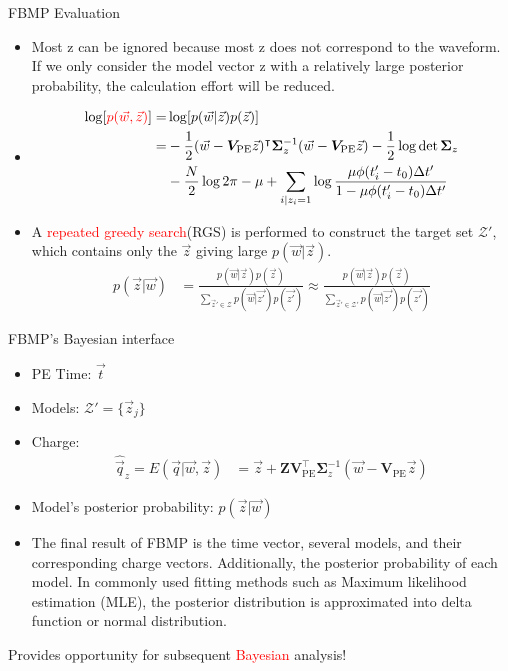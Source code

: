 \documentclass[final]{beamer}
\newlength{\colwidth}
\begin{document}
\begin{frame}[t]
\begin{columns}[t]
\begin{column}{\colwidth}
\begin{block}{FBMP Evaluation}
    \begin{itemize}
      \item Most z can be ignored because most z does not correspond to the waveform. If we only consider the model vector z with a relatively large posterior probability, the calculation effort will be reduced. 
      \item \begin{align*}
          \log[\textcolor{red}{p(\vec{w},\vec{z})}] =& \log[p(\vec{w}|\vec{z})p(\vec{z})] \\
          =& -\frac{1}{2}(\vec{w}-\bm{V}_\mathrm{PE}\vec{z})^\intercal\bm{\Sigma}_z^{-1}(\vec{w}-\bm{V}_\mathrm{PE}\vec{z})-\frac{1}{2}\log\det\bm{\Sigma}_z \\ 
          &-\frac{N}{2}\log2\pi -\mu + \sum_{i|z_i=1}\log \frac{\mu \phi(t'_i - t_0) \Delta t'}{1-\mu \phi(t'_i - t_0) \Delta t'}
          \end{align*}
      \item A \textcolor{red}{repeated greedy search}(RGS) is performed to construct the target set $\mathcal{Z}'$, which contains only the $\vec{z}$ giving large $p(\vec{w}|\vec{z})$. 
      \begin{align*}
        p(\vec{z}|\vec{w}) &= \frac{p(\vec{w}|\vec{z})p(\vec{z})}{\sum_{\vec{z}'\in\mathcal{Z}}p(\vec{w}|\vec{z'})p(\vec{z'})} \approx \frac{p(\vec{w}|\vec{z})p(\vec{z})}{\sum_{\vec{z}'\in\mathcal{Z}'}p(\vec{w}|\vec{z'})p(\vec{z'})}
      \end{align*}
    \end{itemize}

  \end{block}

  \begin{alertblock}{FBMP's Bayesian interface}

    \begin{itemize}
      \item PE Time: $\vec{t}$
      \item Models: $\mathcal{Z}'=\{\vec{z}_j\}$
      \item Charge: \begin{align*}
          \hat{\vec{q}}_z = E(\vec{q}|\vec{w},\vec{z}) &= \vec{z} + \bm{Z}\bm{V}_\mathrm{PE}^\intercal\bm{\Sigma}_z^{-1}(\vec{w}-\bm{V}_\mathrm{PE}\vec{z})
          \end{align*}
      \item Model's posterior probability: $p(\vec{z}|\vec{w})$
      \item The final result of FBMP is the time vector, several models, and their corresponding charge vectors. Additionally, the posterior probability of each model. In commonly used fitting methods such as Maximum likelihood estimation (MLE), the posterior distribution is approximated into delta function or normal distribution. 
    \end{itemize}
    \begin{center}
        Provides opportunity for subsequent \textcolor{red}{Bayesian} analysis! 
    \end{center}


\end{alertblock}
\end{column}
\end{columns}
\end{frame}
\end{document}
